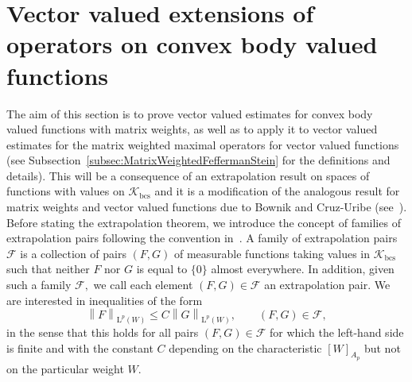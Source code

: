 \documentclass{article}
\theoremstyle{definition}
\theoremstyle{remark}
\numberwithin{equation}{section}
\newcommand{\norm}[2]{\left\|{#1}\right\|_{{#2}}}
\newcommand{\cF}{\mathcal{F}}
\newcommand{\cK}{\mathcal{K}}
\newcommand{\convex}{\cK_{\mathrm{bcs}}}
\newcommand{\Lp}[1]{\mathrm{L}^{#1}}
\newcommand{\1}{\mathbf{1}}
\begin{document}
    \section{Vector valued extensions of operators on convex body valued functions}
    \label{sec:extrapolation_vector_valued}
    The aim of this section is to prove vector valued estimates for convex body valued functions with matrix weights,
    as well as to apply it to vector valued estimates for the matrix weighted maximal operators for vector valued functions
    (see Subsection~\ref{subsec:MatrixWeightedFeffermanStein} for the definitions and details).
    This will be a consequence of an extrapolation result on spaces of functions with values on $\convex$
    and it is a modification of the analogous result for matrix weights and vector valued functions due to
    Bownik and Cruz-Uribe (see~\cite[Section~9]{Cruz_Uribe_Bownik_Extrapolation}).
    Before stating the extrapolation theorem, we introduce the concept of families of extrapolation pairs
    following the convention in~\cite{Book_Extrapolation}.
    A family of extrapolation pairs $\cF$ is a collection of pairs $(F,G)$ of measurable functions
    taking values in $\convex$ such that neither $F$ nor $G$ is equal to $\{0\}$ almost everywhere.
    In addition, given such a family $\cF,$ we call each element $(F,G) \in \cF$ an extrapolation pair.
    We are interested in inequalities of the form
    \begin{equation*}
        \norm{F}{\Lp{p}(W)} \leq C \norm{G}{\Lp{p}(W)},\qquad (F,G) \in \cF,
    \end{equation*}
    in the sense that this holds for all pairs $(F,G) \in \cF$ for which the left-hand side is finite
    and with the constant $C$ depending on the characteristic $[W]_{A_p}$ but not on the particular weight $W.$
\end{document}
